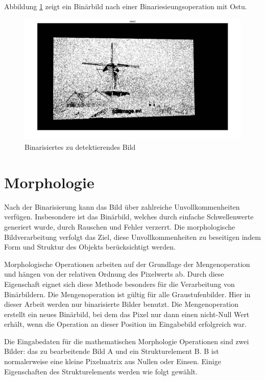 Abbildung \ref{fig:binarisierungbild} zeigt ein Binärbild nach einer Binariesieungsoperation mit Ostu.

\begin{figure}[H]
 \centering 
  \includegraphics[keepaspectratio,width=1.0\textwidth]{images/4_ZweiteErfahrung/binar/binarisierung.pdf}
 \caption{Binarisiertes zu detektierendes Bild}
 \label{fig:binarisierungbild}
\end{figure} 



\section{Morphologie}

Nach der Binarisierung kann das Bild über zahlreiche Unvollkommenheiten verfügen. Insbesondere ist das Binärbild, welches durch einfache Schwellenwerte generiert wurde, durch Rauschen und Fehler verzerrt. Die morphologische Bildverarbeitung verfolgt das Ziel, diese Unvollkommenheiten zu beseitigen indem Form und Struktur des Objekts berücksichtigt werden.

Morphologische Operationen arbeiten auf der Grundlage der Mengenoperation und hängen von der relativen Ordnung des Pixelwerts ab. Durch diese Eigenschaft eignet sich diese Methode besonders für die Verarbeitung von Binärbildern. Die Mengenoperation ist gültig für alle Graustufenbilder. Hier in dieser Arbeit werden nur binarisierte Bilder benutzt. Die Mengenoperation erstellt ein neues Binärbild, bei dem das Pixel nur dann einen nicht-Null Wert erhält, wenn die Operation an dieser Position im Eingabebild erfolgreich war.

Die Eingabedaten für die mathematischen Morphologie Operationen sind zwei Bilder: das zu bearbeitende Bild A und ein Strukturelement B. B ist normalerweise eine kleine Pixelmatrix aus Nullen oder Einsen. Einige Eigenschaften des Strukturelements werden wie folgt gewählt.

